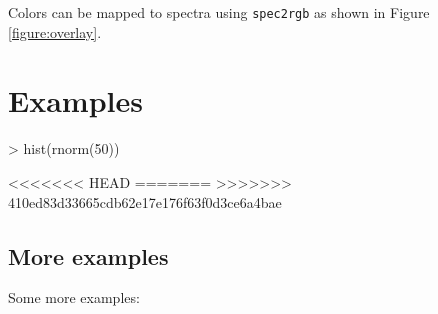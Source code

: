 \documentclass{article}
\newcommand{\code}[1]{{\tt #1}}  %
\begin{document}
Colors can be mapped to spectra using \code{spec2rgb} as shown in 
Figure \ref{figure:overlay}.

\section*{Examples}


\begin{Schunk}
\begin{Sinput}
> hist(rnorm(50))
\end{Sinput}
\end{Schunk}

<<<<<<< HEAD
=======
>>>>>>> 410ed83d33665cdb62e17e176f63f0d3ce6a4bae

\subsection*{More examples}

Some more examples:


\end{document}
